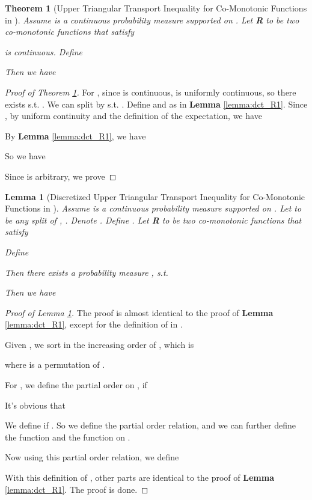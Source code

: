 \documentclass[nohyperref]{article}
\theoremstyle{plain}
\newtheorem{Theorem}{\textbf{Theorem}}
\newtheorem{Lemma}{\textbf{Lemma}}
\begin{document}
\begin{Theorem}[Upper Triangular Transport Inequality for Co-Monotonic Functions in ]
Assume  is a continuous probability measure supported on .
Let  \textbf{R} to be two co-monotonic functions that satisfy

 is continuous.
Define 

Then we have 

\label{thm:cts_R1}
\end{Theorem}

\begin{proof}[Proof of Theorem \ref{thm:cts_R1}]

For , since  is continuous,  is uniformly continuous, so there exists  s.t. .
We can split  by  s.t. .
Define  and  as in \textbf{Lemma} \ref{lemma:dct_R1}.
Since , by uniform continuity and the definition of the expectation, we have

By \textbf{Lemma} \ref{lemma:dct_R1}, we have 

So we have

Since  is arbitrary, we prove 

\end{proof}

\begin{Lemma}[Discretized Upper Triangular Transport Inequality for Co-Monotonic Functions in ]
Assume  is a continuous probability measure supported on . 
Let  to be any split of , .
Denote .
Define . 
Let  \textbf{R} to be two co-monotonic functions that satisfy

Define 
 
Then there exists a probability measure 
, s.t. 

Then we have

\label{lemma:dct_Rp}
\end{Lemma}

\begin{proof}[Proof of Lemma \ref{lemma:dct_Rp}]

The proof is almost identical to the proof of \textbf{Lemma} \ref{lemma:dct_R1}, except for the definition of  in .



Given , we sort  in the increasing order of , which is 

where  is a permutation of .

For , we define the partial order  on , if 

It's obvious that 

We define  if .
So we define the partial order relation, and we can further define the  function and the  function on .

Now using this partial order relation, we define 


With this definition of , other parts are identical to the proof of \textbf{Lemma} \ref{lemma:dct_R1}.
The proof is done.

\end{proof}
\end{document}
